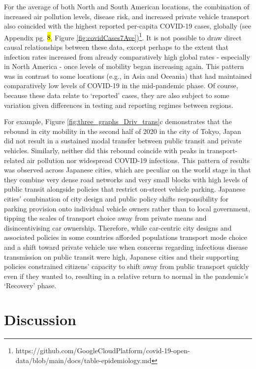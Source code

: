 \documentclass[preprint,10pt]{elsarticle} %
\begin{document}
For the average of both North and South American locations, the combination of increased air pollution levels, disease risk, and increased private vehicle transport also coincided with the highest reported per-capita COVID-19 cases, globally (see Appendix pg. \hl{8}, Figure \ref{fig:covidCases7Ave})\footnote{https://github.com/GoogleCloudPlatform/covid-19-open-data/blob/main/docs/table-epidemiology.md}. It is not possible to draw direct causal relationships between these data, except perhaps to the extent that infection rates increased from already comparatively high global rates - especially in North America - once levels of mobility began increasing again. This pattern was in contrast to some locations (e.g., in Asia and Oceania) that had maintained comparatively low levels of COVID-19 in the mid-pandemic phase. Of course, because these data relate to `reported' cases, they are also subject to some variation given differences in testing and reporting regimes between regions.

For example, Figure \ref{fig:three_graphs_Driv_trans}c demonstrates that the rebound in city mobility in the second half of 2020 in the city of Tokyo, Japan did not result in a sustained modal transfer between public transit and private vehicles. Similarly, neither did this rebound coincide with peaks in transport-related air pollution nor widespread COVID-19 infections. This pattern of results was observed across Japanese cities, which are peculiar on the world stage in that they combine very dense road networks and very small blocks with high levels of public transit alongside policies that restrict on-street vehicle parking\cite{clements2019socialising}. Japanese cities' combination of city design and public policy shifts responsibility for parking provision onto individual vehicle owners rather than to local government, tipping the scales of transport choice away from private means and disincentivising car ownership. Therefore, while car-centric city designs and associated policies in some countries afforded populations transport mode choice and a shift toward private vehicle use when concerns regarding infectious disease transmission on public transit were high, Japanese cities and their supporting policies constrained citizens' capacity to shift away from public transport quickly even if they wanted to, resulting in a relative return to normal in the pandemic's `Recovery' phase.

\section*{Discussion}
\end{document}
